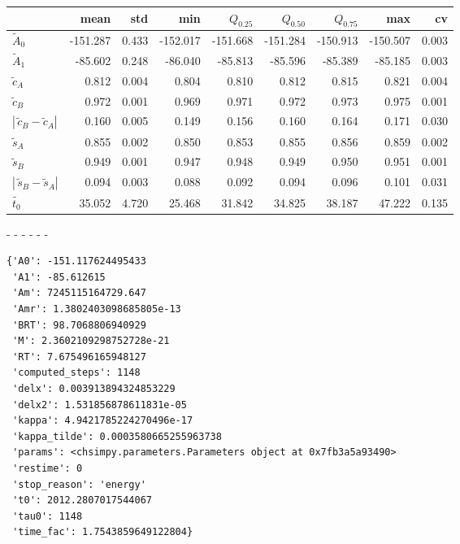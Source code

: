 \documentclass{scrartcl}\usepackage{graphicx,booktabs,pgf}\newcommand{\randA}{\widetilde{A}}
\newcommand{\randc}{\widetilde{c}}
\newcommand{\rands}{\widetilde{s}}
\newcommand{\tsep}{t_0}%
\newcommand{\randtsep}{\widetilde{\tsep}}
\begin{document}
\begin{tabular}{lrrrrrrrr}
\toprule
 & mean & std & min & $Q_{0.25}$ & $Q_{0.50}$ & $Q_{0.75}$ & max & cv \\
\midrule
$\randA_0$ & -151.287 & 0.433 & -152.017 & -151.668 & -151.284 & -150.913 & -150.507 & 0.003 \\
$\randA_1$ & -85.602 & 0.248 & -86.040 & -85.813 & -85.596 & -85.389 & -85.185 & 0.003 \\
$\randc_A$ & 0.812 & 0.004 & 0.804 & 0.810 & 0.812 & 0.815 & 0.821 & 0.004 \\
$\randc_B$ & 0.972 & 0.001 & 0.969 & 0.971 & 0.972 & 0.973 & 0.975 & 0.001 \\
$|\,\randc_B-\randc_A|$ & 0.160 & 0.005 & 0.149 & 0.156 & 0.160 & 0.164 & 0.171 & 0.030 \\
$\rands_A$ & 0.855 & 0.002 & 0.850 & 0.853 & 0.855 & 0.856 & 0.859 & 0.002 \\
$\rands_B$ & 0.949 & 0.001 & 0.947 & 0.948 & 0.949 & 0.950 & 0.951 & 0.001 \\
$|\,\rands_B-\rands_A|$ & 0.094 & 0.003 & 0.088 & 0.092 & 0.094 & 0.096 & 0.101 & 0.031 \\
$\randtsep$ & 35.052 & 4.720 & 25.468 & 31.842 & 34.825 & 38.187 & 47.222 & 0.135 \\
\bottomrule
\end{tabular}
\newline - \newline
\newline - \newline
\newline - \newline
\newline - \newline
\newline - \newline
\newline - \newline
\begin{verbatim}{'A0': -151.117624495433
 'A1': -85.612615
 'Am': 7245115164729.647
 'Amr': 1.3802403098685805e-13
 'BRT': 98.7068806940929
 'M': 2.3602109298752728e-21
 'RT': 7.675496165948127
 'computed_steps': 1148
 'delx': 0.003913894324853229
 'delx2': 1.531856878611831e-05
 'kappa': 4.9421785224270496e-17
 'kappa_tilde': 0.0003580665255963738
 'params': <chsimpy.parameters.Parameters object at 0x7fb3a5a93490>
 'restime': 0
 'stop_reason': 'energy'
 't0': 2012.2807017544067
 'tau0': 1148
 'time_fac': 1.7543859649122804}\end{verbatim}
\end{document}
